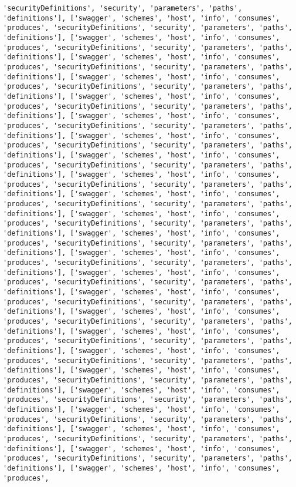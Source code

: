 \documentclass[11pt]{article}
\begin{document}
\begin{Verbatim}[commandchars=\\\{\}]
'securityDefinitions', 'security', 'parameters', 'paths', 'definitions'], ['swagger', 'schemes', 'host', 'info', 'consumes', 'produces', 'securityDefinitions', 'security', 'parameters', 'paths', 'definitions'], ['swagger', 'schemes', 'host', 'info', 'consumes', 'produces', 'securityDefinitions', 'security', 'parameters', 'paths', 'definitions'], ['swagger', 'schemes', 'host', 'info', 'consumes', 'produces', 'securityDefinitions', 'security', 'parameters', 'paths', 'definitions'], ['swagger', 'schemes', 'host', 'info', 'consumes', 'produces', 'securityDefinitions', 'security', 'parameters', 'paths', 'definitions'], ['swagger', 'schemes', 'host', 'info', 'consumes', 'produces', 'securityDefinitions', 'security', 'parameters', 'paths', 'definitions'], ['swagger', 'schemes', 'host', 'info', 'consumes', 'produces', 'securityDefinitions', 'security', 'parameters', 'paths', 'definitions'], ['swagger', 'schemes', 'host', 'info', 'consumes', 'produces', 'securityDefinitions', 'security', 'parameters', 'paths', 'definitions'], ['swagger', 'schemes', 'host', 'info', 'consumes', 'produces', 'securityDefinitions', 'security', 'parameters', 'paths', 'definitions'], ['swagger', 'schemes', 'host', 'info', 'consumes', 'produces', 'securityDefinitions', 'security', 'parameters', 'paths', 'definitions'], ['swagger', 'schemes', 'host', 'info', 'consumes', 'produces', 'securityDefinitions', 'security', 'parameters', 'paths', 'definitions'], ['swagger', 'schemes', 'host', 'info', 'consumes', 'produces', 'securityDefinitions', 'security', 'parameters', 'paths', 'definitions'], ['swagger', 'schemes', 'host', 'info', 'consumes', 'produces', 'securityDefinitions', 'security', 'parameters', 'paths', 'definitions'], ['swagger', 'schemes', 'host', 'info', 'consumes', 'produces', 'securityDefinitions', 'security', 'parameters', 'paths', 'definitions'], ['swagger', 'schemes', 'host', 'info', 'consumes', 'produces', 'securityDefinitions', 'security', 'parameters', 'paths', 'definitions'], ['swagger', 'schemes', 'host', 'info', 'consumes', 'produces', 'securityDefinitions', 'security', 'parameters', 'paths', 'definitions'], ['swagger', 'schemes', 'host', 'info', 'consumes', 'produces', 'securityDefinitions', 'security', 'parameters', 'paths', 'definitions'], ['swagger', 'schemes', 'host', 'info', 'consumes', 'produces', 'securityDefinitions', 'security', 'parameters', 'paths', 'definitions'], ['swagger', 'schemes', 'host', 'info', 'consumes', 'produces', 'securityDefinitions', 'security', 'parameters', 'paths', 'definitions'], ['swagger', 'schemes', 'host', 'info', 'consumes', 'produces', 'securityDefinitions', 'security', 'parameters', 'paths', 'definitions'], ['swagger', 'schemes', 'host', 'info', 'consumes', 'produces', 'securityDefinitions', 'security', 'parameters', 'paths', 'definitions'], ['swagger', 'schemes', 'host', 'info', 'consumes', 'produces', 'securityDefinitions', 'security', 'parameters', 'paths', 'definitions'], ['swagger', 'schemes', 'host', 'info', 'consumes', 'produces', 'securityDefinitions', 'security', 'parameters', 'paths', 'definitions'], ['swagger', 'schemes', 'host', 'info', 'consumes', 'produces', 'securityDefinitions', 'security', 'parameters', 'paths', 'definitions'], ['swagger', 'schemes', 'host', 'info', 'consumes', 'produces', 
\end{Verbatim}
\end{document}
